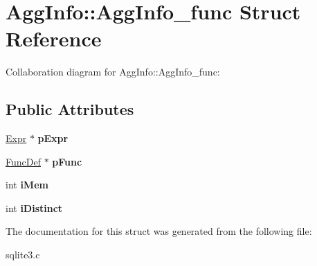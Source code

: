 \hypertarget{structAggInfo_1_1AggInfo__func}{}\section{Agg\+Info\+:\+:Agg\+Info\+\_\+func Struct Reference}
\label{structAggInfo_1_1AggInfo__func}


Collaboration diagram for Agg\+Info\+:\+:Agg\+Info\+\_\+func\+:
\subsection*{Public Attributes}
\begin{DoxyCompactItemize}
\item 
\hyperlink{structExpr}{Expr} $\ast$ {\bfseries p\+Expr}\hypertarget{structAggInfo_1_1AggInfo__func_a7b92e1c42e60d44e28ebf695316f4018}{}\label{structAggInfo_1_1AggInfo__func_a7b92e1c42e60d44e28ebf695316f4018}

\item 
\hyperlink{structFuncDef}{Func\+Def} $\ast$ {\bfseries p\+Func}\hypertarget{structAggInfo_1_1AggInfo__func_a840478e8ec53cefa57b50228f6fdafe4}{}\label{structAggInfo_1_1AggInfo__func_a840478e8ec53cefa57b50228f6fdafe4}

\item 
int {\bfseries i\+Mem}\hypertarget{structAggInfo_1_1AggInfo__func_a41a8da36555c37fffc65f1acead49a4f}{}\label{structAggInfo_1_1AggInfo__func_a41a8da36555c37fffc65f1acead49a4f}

\item 
int {\bfseries i\+Distinct}\hypertarget{structAggInfo_1_1AggInfo__func_a4a82635b0116eb44ec8ca9e47cc509d9}{}\label{structAggInfo_1_1AggInfo__func_a4a82635b0116eb44ec8ca9e47cc509d9}

\end{DoxyCompactItemize}


The documentation for this struct was generated from the following file\+:\begin{DoxyCompactItemize}
\item 
sqlite3.\+c\end{DoxyCompactItemize}
